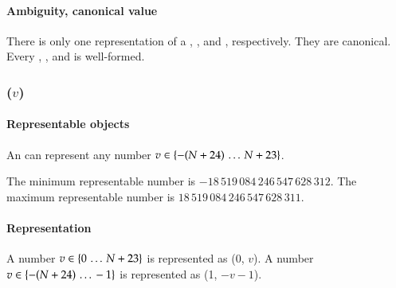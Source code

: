 \paragraph{Ambiguity, canonical value}

There is only one representation of a \DborMinusZeroValue,
\DborInfinityValue, and \DborMinusInfinityValue, respectively.
They are canonical.
Every \DborMinusZeroValue, \DborInfinityValue,
and \DborMinusInfinityValue{} is well-formed.


\subsubsection{\DborIntegerValue(\texorpdfstring{$v$}{v})}
\hypertarget{sec:def:IntegerValue}{}

\paragraph{Representable objects}

An \DborIntegerValue{} can represent any number $v \in \{-(N + 24) \,\ldots\, N + 23\}$.

\smallskip
The minimum representable number is $-18\,519\,084\,246\,547\,628\,312$.
The maximum representable number is $18\,519\,084\,246\,547\,628\,311$.

\paragraph{Representation}

A number $v \in \{0 \,\ldots\, N + 23\}$ is represented as \DborIntegerToken*(0, $v$).
A number $v \in \{-(N + 24) \,\ldots\, -1\}$ is represented as \DborIntegerToken*(1, $-v - 1$).

